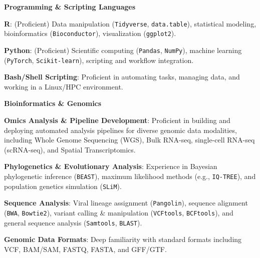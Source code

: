 \documentclass[11pt, a4paper]{awesome-cv}
\begin{document}

\begin{cvparagraph}
\textbf{Programming \& Scripting Languages}
\vspace{4.5mm}
\begin{cvitems}
  \item \textbf{R}: (Proficient) Data manipulation (\texttt{Tidyverse}, \texttt{data.table}), statistical modeling, bioinformatics (\texttt{Bioconductor}), visualization (\texttt{ggplot2}).
  \item \textbf{Python}: (Proficient) Scientific computing (\texttt{Pandas}, \texttt{NumPy}), machine learning (\texttt{PyTorch}, \texttt{Scikit-learn}), scripting and workflow integration.
  \item \textbf{Bash/Shell Scripting}: Proficient in automating tasks, managing data, and working in a Linux/HPC environment.
\end{cvitems}

\vspace{4mm}
\textbf{Bioinformatics \& Genomics}
\vspace{4.5mm}
\begin{cvitems}
  \item \textbf{Omics Analysis \& Pipeline Development}: Proficient in building and deploying automated analysis pipelines for diverse genomic data modalities, including Whole Genome Sequencing (WGS), Bulk RNA-seq, single-cell RNA-seq (scRNA-seq), and Spatial Transcriptomics.
  \item \textbf{Phylogenetics \& Evolutionary Analysis}: Experience in Bayesian phylogenetic inference (\texttt{BEAST}), maximum likelihood methods (e.g., \texttt{IQ-TREE}), and population genetics simulation (\texttt{SLiM}).
  \item \textbf{Sequence Analysis}: Viral lineage assignment (\texttt{Pangolin}), sequence alignment (\texttt{BWA}, \texttt{Bowtie2}), variant calling \& manipulation (\texttt{VCFtools}, \texttt{BCFtools}), and general sequence analysis (\texttt{Samtools}, \texttt{BLAST}).
  \item \textbf{Genomic Data Formats}: Deep familiarity with standard formats including VCF, BAM/SAM, FASTQ, FASTA, and GFF/GTF.
\end{cvitems}


\end{cvparagraph}
\end{document}
